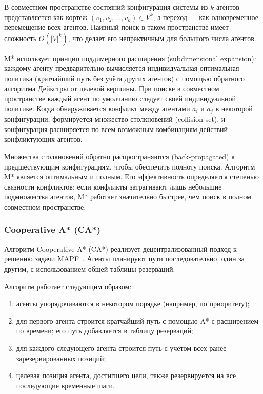 В совместном пространстве состояний конфигурация системы из $k$ агентов представляется как кортеж $(v_1, v_2, \ldots, v_k) \in V^k$, а переход --- как одновременное перемещение всех агентов. Наивный поиск в таком пространстве имеет сложность $O(|V|^k)$, что делает его непрактичным для большого числа агентов.

M* использует принцип поддимерного расширения (subdimensional expansion): каждому агенту предварительно вычисляется индивидуальная оптимальная политика (кратчайший путь без учёта других агентов) с помощью обратного алгоритма Дейкстры от целевой вершины. При поиске в совместном пространстве каждый агент по умолчанию следует своей индивидуальной политике. Когда обнаруживается конфликт между агентами $a_i$ и $a_j$ в некоторой конфигурации, формируется множество столкновений (collision set), и конфигурация расширяется по всем возможным комбинациям действий конфликтующих агентов.

Множества столкновений обратно распространяются (back-propagated) к предшествующим конфигурациям, чтобы обеспечить полноту поиска. Алгоритм M* является оптимальным и полным. Его эффективность определяется степенью связности конфликтов: если конфликты затрагивают лишь небольшие подмножества агентов, M* работает значительно быстрее, чем поиск в полном совместном пространстве.

\subsubsection{Cooperative A* (CA*)}

Алгоритм Cooperative A* (CA*) реализует децентрализованный подход к решению задачи MAPF~\cite{silver2005cooperative}. Агенты планируют пути последовательно, один за другим, с использованием общей таблицы резерваций.

Алгоритм работает следующим образом:
\begin{enumerate}[arabic]
    \item агенты упорядочиваются в некотором порядке (например, по приоритету);
    \item для первого агента строится кратчайший путь с помощью A* с расширением по времени; его путь добавляется в таблицу резерваций;
    \item для каждого следующего агента строится путь с учётом всех ранее зарезервированных позиций;
    \item целевая позиция агента, достигшего цели, также резервируется на все последующие временные шаги.
\end{enumerate}


